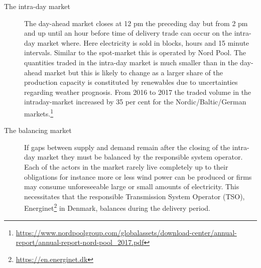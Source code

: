 \begin{description}
    \item [The intra-day market]
     The day-ahead market closes at 12 pm the preceding day but from 2 pm and up until an hour before time of delivery trade can occur on the intra-day market where. Here electricity is sold in blocks, hours and 15 minute intervals. Similar to the spot-market this is operated by Nord Pool. The quantities traded in the intra-day market is much smaller than in the day-ahead market but this is likely to change as a larger share of the production capacity is constituted by renewables due to uncertainties regarding weather prognosis. From 2016 to 2017 the traded volume in the intraday-market increased by 35 per cent for the Nordic/Baltic/German markets.\footnote{\url{https://www.nordpoolgroup.com/globalassets/download-center/annual-report/annual-report-nord-pool_2017.pdf}}  %

    \item [The balancing market]
    If gaps between supply and demand remain after the closing of the intra-day market they must be balanced by the responsible system operator. Each of the actors in the market rarely live completely up to their obligations for instance more or less wind power can be produced or firms may consume unforeseeable large or small amounts of electricity. This necessitates that the responsible Transmission System Operator (TSO), Energinet\footnote{\url{https://en.energinet.dk}} in Denmark, balances during the delivery period. %


\end{description}


